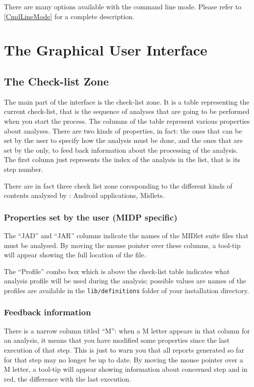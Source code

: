 There are many options available with the command line mode. Please
refer to \ref{CmdLineMode} for a complete description.

\section{The Graphical User Interface}

\subsection{The Check-list Zone}
The main part of the interface is the check-list zone. It is a table
representing the current check-list, that is the sequence of analyses
that are going to be performed when you start the process. The columns
of the table represent various properties about analyses. There are
two kinds of properties, in fact: the ones that can be set by the user
to specify how the analysis must be done, and the ones that are
set by the \ma only, to feed back information about the processing of
the analysis. The first column just represents the index of the
analysis in the list, that is its step number.

There are in fact three check list zone coresponding to the different kinds of
contents analyzed by \ma : Android applications, Midlets.

\subsubsection*{Properties set by the user (MIDP specific)} The ``JAD'' and
``JAR'' columns indicate the names of the MIDlet suite files that must be analysed. By moving the mouse pointer over these columns, a tool-tip will appear showing the
full location of the file.


The ``Profile'' combo box which is above the check-list table indicates what
analysis profile will be used during the analysis; possible values are names of
the profiles are available in the \texttt{lib/definitions} folder of your
installation directory.

\subsubsection*{Feedback information}
There is a narrow column titled ``M'': when a M letter appears in that
column for an analysis, it means that you have modified some
properties since the last execution of that step. This is just to warn
you that all reports generated so far for that step may no longer be
up to date. By moving the mouse pointer over a M letter, a tool-tip will appear
showing information about concerned step and in red, the difference with the last
execution.

